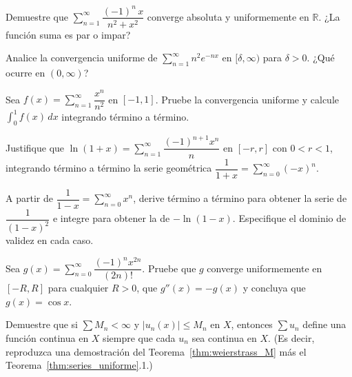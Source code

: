\begin{prob}Demuestre que $\sum_{n=1}^\infty \dfrac{(-1)^n\, x}{n^2 + x^2}$
          converge absoluta y uniformemente en $\mathbb{R}$.
          ¿La función suma es par o impar?
\end{prob}

\begin{prob} Analice la convergencia uniforme de
          $\sum_{n=1}^\infty n^2 e^{-nx}$ en $[\delta, \infty)$
          para $\delta > 0$. ¿Qué ocurre en $(0, \infty)$?
\end{prob}

\begin{prob} Sea $f(x) = \sum_{n=1}^\infty \dfrac{x^n}{n^2}$ en $[-1,1]$.
          Pruebe la convergencia uniforme y calcule
          $\int_0^1 f(x)\,dx$ integrando término a término.
\end{prob}

\begin{prob} Justifique que
          $\ln(1+x) = \sum_{n=1}^\infty \dfrac{(-1)^{n+1}x^n}{n}$
          en $[-r, r]$ con $0 < r < 1$, integrando término a término
          la serie geométrica $\dfrac{1}{1+x} = \sum_{n=0}^\infty
          (-x)^n$.
\end{prob}

\begin{prob} A partir de $\dfrac{1}{1-x} = \sum_{n=0}^\infty x^n$,
          derive término a término para obtener la serie de
          $\dfrac{1}{(1-x)^2}$ e integre para obtener la de
          $-\ln(1-x)$. Especifique el dominio de validez en cada caso.
\end{prob}

\begin{prob} Sea $g(x) = \sum_{n=0}^\infty \dfrac{(-1)^n x^{2n}}{(2n)!}$.
          Pruebe que $g$ converge uniformemente en $[-R, R]$ para
          cualquier $R>0$, que $g''(x) = -g(x)$ y concluya que
          $g(x) = \cos x$.
\end{prob}


\begin{prob} Demuestre que si $\sum M_n < \infty$ y $|u_n(x)| \leq M_n$
          en $X$, entonces $\sum u_n$ define una función continua en
          $X$ siempre que cada $u_n$ sea continua en $X$. (Es decir,
          reproduzca una demostración del Teorema~\ref{thm:weierstrass_M}
          más el Teorema~\ref{thm:series_uniforme}.1.)

\end{prob}

